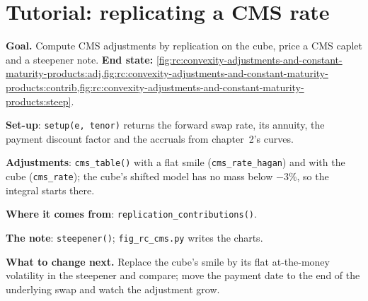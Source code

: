 \begin{omfigure}

\label{fig:rc:convexity-adjustments-and-constant-maturity-products:steep}
\end{omfigure}

\section{Tutorial: replicating a CMS rate}\label{tut:rc:convexity-adjustments-and-constant-maturity-products:tutorial}

\begin{tutorial}
\textbf{Goal.} Compute CMS adjustments by replication on the cube, price a CMS
caplet and a steepener note. \textbf{End state:}
\cref{fig:rc:convexity-adjustments-and-constant-maturity-products:adj,fig:rc:convexity-adjustments-and-constant-maturity-products:contrib,fig:rc:convexity-adjustments-and-constant-maturity-products:steep}.
\begin{tutsteps}
\item \textbf{Set-up}: \texttt{setup(e, tenor)} returns the forward swap rate, its
annuity, the payment discount factor and the accruals from chapter~2's curves.
\item \textbf{Adjustments}: \texttt{cms\_table()} with a flat smile
(\texttt{cms\_rate\_hagan}) and with the cube (\texttt{cms\_rate}); the cube's
shifted model has no mass below $-3\%$, so the integral starts there.
\item \textbf{Where it comes from}: \texttt{replication\_contributions()}.
\item \textbf{The note}: \texttt{steepener()}; \texttt{fig\_rc\_cms.py} writes the
charts.
\end{tutsteps}
\textbf{What to change next.} Replace the cube's smile by its flat at-the-money
volatility in the steepener and compare; move the payment date to the end of
the underlying swap and watch the adjustment grow.
\end{tutorial}

